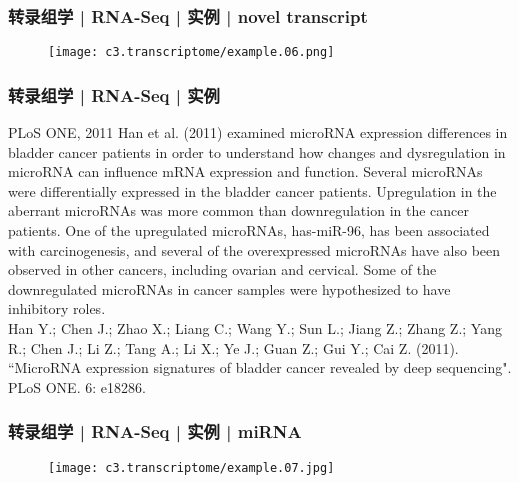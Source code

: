 \begin{frame}
  \frametitle{转录组学 | RNA-Seq | 实例 | novel transcript}
  \begin{figure}
    \centering
    \texttt{[image: c3.transcriptome/example.06.png]}
  \end{figure}
\end{frame}

\begin{frame}
  \frametitle{转录组学 | RNA-Seq | 实例}
  \begin{block}{PLoS ONE, 2011}
  Han et al. (2011) examined microRNA expression differences in bladder cancer patients in order to understand how changes and dysregulation in microRNA can influence mRNA expression and function. Several microRNAs were differentially expressed in the bladder cancer patients. Upregulation in the aberrant microRNAs was more common than downregulation in the cancer patients. One of the upregulated microRNAs, has-miR-96, has been associated with carcinogenesis, and several of the overexpressed microRNAs have also been observed in other cancers, including ovarian and cervical. Some of the downregulated microRNAs in cancer samples were hypothesized to have inhibitory roles.\\
  \vspace{0.5em}
Han Y.; Chen J.; Zhao X.; Liang C.; Wang Y.; Sun L.; Jiang Z.; Zhang Z.; Yang R.; Chen J.; Li Z.; Tang A.; Li X.; Ye J.; Guan Z.; Gui Y.; Cai Z. (2011). ``MicroRNA expression signatures of bladder cancer revealed by deep sequencing". PLoS ONE. 6: e18286. 
  \end{block}
\end{frame}

\begin{frame}
  \frametitle{转录组学 | RNA-Seq | 实例 | miRNA}
  \begin{figure}
    \centering
    \texttt{[image: c3.transcriptome/example.07.jpg]}
  \end{figure}
\end{frame}
